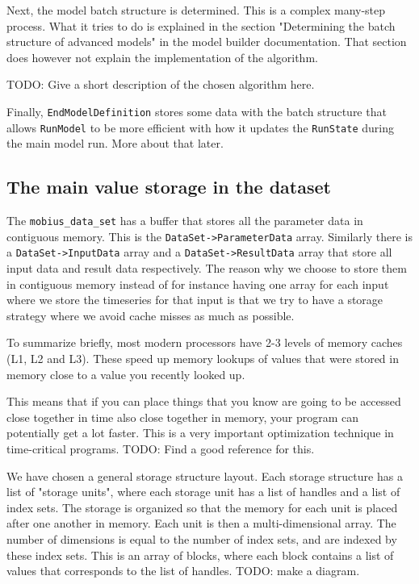 \documentclass[11pt]{article}
\theoremstyle{definition}
\begin{document}
Next, the model batch structure is determined. This is a complex many-step process. What it tries to do is explained in the section "Determining the batch structure of advanced models" in the model builder documentation. That section does however not explain the implementation of the algorithm.

TODO: Give a short description of the chosen algorithm here.

Finally, {\tt EndModelDefinition} stores some data with the batch structure that allows {\tt RunModel} to be more efficient with how it updates the {\tt RunState} during the main model run. More about that later.

\subsection{The main value storage in the dataset}

The {\tt mobius\_data\_set} has a buffer that stores all the parameter data in contiguous memory. This is the {\tt DataSet->ParameterData} array. Similarly there is a {\tt DataSet->InputData} array and a {\tt DataSet->ResultData} array that store all input data and result data respectively. The reason why we choose to store them in contiguous memory instead of for instance having one array for each input where we store the timeseries for that input is that we try to have a storage strategy where we avoid cache misses as much as possible.

To summarize briefly, most modern processors have 2-3 levels of memory caches (L1, L2 and L3). These speed up memory lookups of values that were stored in memory close to a value you recently looked up.

This means that if you can place things that you know are going to be accessed close together in time also close together in memory, your program can potentially get a lot faster. This is a very important optimization technique in time-critical programs. TODO: Find a good reference for this.

We have chosen a general storage structure layout. Each storage structure has a list of "storage units", where each storage unit has a list of handles and a list of index sets. The storage is organized so that the memory for each unit is placed after one another in memory. Each unit is then a multi-dimensional array. The number of dimensions is equal to the number of index sets, and are indexed by these index sets. This is an array of blocks, where each block contains a list of values that corresponds to the list of handles. TODO: make a diagram.
\end{document}
